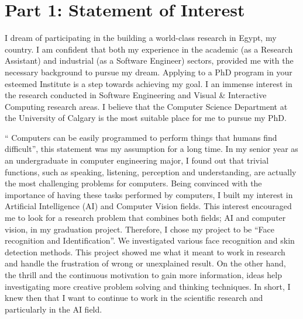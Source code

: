 \documentclass[10pt]{article}%
\begin{document}
\section*{Part 1: Statement of Interest}

I dream of participating in the building a world-class research in Egypt, my country. I am confident that  both my experience in the academic (as a Research Assistant) and industrial (as a Software Engineer) sectors, provided me with the necessary background to pursue my dream. Applying to a PhD program in your esteemed Institute is a step towards achieving my goal. I an immense interest in the research conducted in Software Engineering and Visual & Interactive Computing research areas. I believe that the Computer Science Department at the University of Calgary is the most suitable place for me to pursue my PhD.

`` Computers can be easily programmed to perform things that humans find difficult'', this statement was my assumption for a long time. In my senior year as an undergraduate in computer engineering major, I found out that trivial functions, such as speaking, listening, perception and understanding, are actually the most challenging problems for computers. Being convinced with the importance of having these tasks performed by computers, I built my interest in Artificial Intelligence (AI) and Computer Vision fields.
 This interest encouraged me to look for a research problem that combines both fields; AI and computer vision, in my graduation project. Therefore, I chose my project to be ``Face recognition and Identification''. We investigated various face recognition and skin detection methods. This project showed me what it meant to work in research and handle the frustration of wrong or unexplained result. On the other hand, the thrill and the continuous motivation to gain more information, ideas help investigating more creative problem solving and thinking techniques. In short, I knew then that I want to continue to work in the scientific research and particularly in the AI field.
\end{document}
